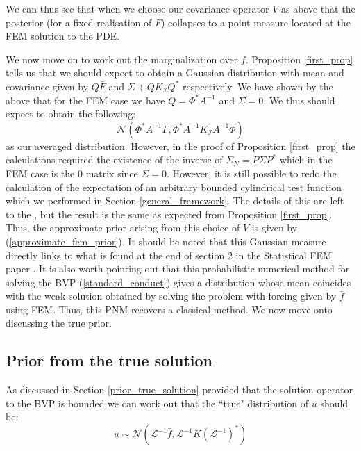 We can thus see that when we choose our covariance operator $V$ as above that the posterior (for a fixed realisation of $F$) collapses to a point measure located at the FEM solution to the PDE.

We now move on to work out the marginalization over $f$. Proposition \textcolor{blue}{\ref{first_prop}} tells us that we should expect to obtain a Gaussian distribution with mean and covariance given by $Q\bar{F}$ and $\Sigma+QK_{\mathcal{I}}Q^{*}$ respectively. We have shown by the above that for the FEM case we have $Q=\Phi^{*}A^{-1}$ and $\Sigma=0$. We thus should expect to obtain the following:
\begin{equation}
    \label{approximate_fem_prior}
    \mathcal{N}(\Phi^{*}A^{-1}\bar{F},\Phi^{*}A^{-1}K_{\mathcal{I}}A^{-1}\Phi)
\end{equation}
as our averaged distribution. However, in the proof of Proposition \textcolor{blue}{\ref{first_prop}} the calculations required the existence of the inverse of $\Sigma_{N}=P\Sigma P^{*}$ which in the FEM case is the $0$ matrix since $\Sigma=0$. However, it is still possible to redo the calculation of the expectation of an arbitrary bounded cylindrical test function which we performed in Section \textcolor{blue}{\ref{general_framework}}. The details of this are left to the \textcolor{blue}{}, but the result is the same as expected from Proposition \textcolor{blue}{\ref{first_prop}}. Thus, the approximate prior arising from this choice of $V$ is given by (\ref{approximate_fem_prior}). It should be noted that this Gaussian measure directly links to what is found at the end of section 2 in the Statistical FEM paper \textcolor{blue}{\cite{girolami2019statistical}}. It is also worth pointing out that this probabilistic numerical method for solving the BVP (\ref{standard_conduct}) gives a distribution whose mean coincides with the weak solution obtained by solving the problem with forcing given by $\bar{f}$ using FEM. Thus, this PNM recovers a classical method. We now move onto discussing the true prior.

\subsection{Prior from the true solution}

As discussed in Section \textcolor{blue}{\ref{prior_true_solution}} provided that the solution operator to the BVP is bounded we can work out that the ``true" distribution of $u$ should be:
\begin{equation}
    \label{true_prior_elliptic}
    u\sim\mathcal{N}(\mathcal{L}^{-1}\bar{f},\mathcal{L}^{-1}K(\mathcal{L}^{-1})^{*})
\end{equation}

